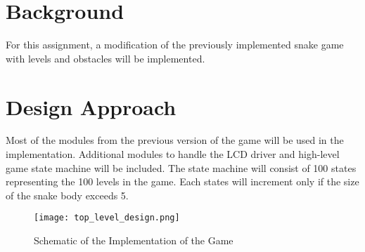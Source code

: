 \documentclass[paper=usletter, fontsize=12pt]{article}
\begin{document}
    \vspace{-0.1in}

    \section{Background} For this assignment, a modification of the previously
    implemented snake game with levels and obstacles will be implemented.

    \section{Design Approach} Most of the modules from the previous version of
    the game will be used in the implementation. Additional modules to handle
    the LCD driver and high-level game state machine will be included. The
    state machine will consist of 100 states representing the 100 levels in the
    game. Each states will increment only if the size of the snake body exceeds
    5.

    \begin{figure}[ht]
        \begin{center}
            \texttt{[image: top\_level\_design.png]}
            \caption{Schematic of the Implementation of the Game}
            \label{fig:schematic}
        \end{center}
    \end{figure}
    \newpage
\end{document}
